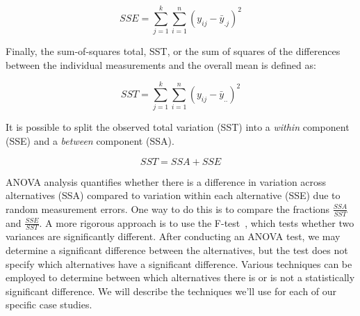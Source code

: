 \begin{equation}
    SSE = \sum_{j = 1}^{k}\sum_{i = 1}^{n} (y_{ij} - \bar{y}_{.j})^2
\end{equation}

Finally, the sum-of-squares total, SST, or the sum of squares of the differences between the individual measurements and the overall mean is defined as:

\begin{equation}
    SST = \sum_{j = 1}^{k}\sum_{i = 1}^{n} (y_{ij} - \bar{y}_{..})^2
\end{equation}

It is possible to split the observed total variation (SST) into a \emph{within} component (SSE) and a \emph{between} component (SSA).

\begin{equation}
    SST = SSA + SSE
\end{equation}

ANOVA analysis quantifies whether there is a difference in variation across alternatives (SSA) compared to variation within each alternative (SSE) due to random measurement errors. One way to do this is to compare the fractions \(\frac{SSA}{SST}\) and \(\frac{SSE}{SST}\). A more rigorous approach is to use the F-test~\cite{lilja2005measuring}, which tests whether two variances are significantly different.  After conducting an ANOVA test, we may determine a significant difference between the alternatives, but the test does not specify which alternatives have a significant difference. Various techniques can be employed to determine between which alternatives there is or is not a statistically significant difference. We will describe the techniques we'll use for each of our specific case studies.